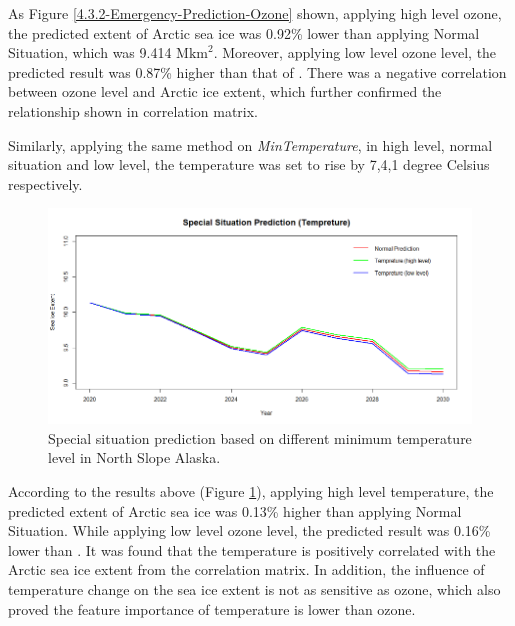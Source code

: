As Figure \ref{4.3.2-Emergency-Prediction-Ozone} shown, applying high level ozone, the predicted extent of Arctic sea ice was 0.92\% lower than applying Normal Situation, which was 9.414 $\text{Mkm}^2$. Moreover, applying low level ozone level, the predicted result was 0.87\% higher than that of . There was a negative correlation between ozone level and Arctic ice extent, which further confirmed the relationship shown in correlation matrix.

Similarly, applying the same method on \textit{MinTemperature}, in high level, normal situation and low level, the temperature was set to rise by 7,4,1 degree Celsius respectively.


\begin{figure}[htbp]
\centering
\includegraphics[width = 1.0\textwidth]{Figure/4.3.2-Emergency-Prediction-Temp.png}
\caption{Special situation prediction based on different minimum temperature level in North Slope Alaska.}
\label{4.3.2-Emergency-Prediction-Temp}
\end{figure}

According to the results above (Figure \ref{4.3.2-Emergency-Prediction-Temp}), applying high level temperature, the predicted extent of Arctic sea ice was 0.13\% higher than applying Normal Situation. While applying low level ozone level, the predicted result was 0.16\% lower than . It was found that the temperature is positively correlated with the Arctic sea ice extent from the correlation matrix. In addition, the influence of temperature change on the sea ice extent is not as sensitive as ozone, which also proved the feature importance of temperature is lower than ozone.
